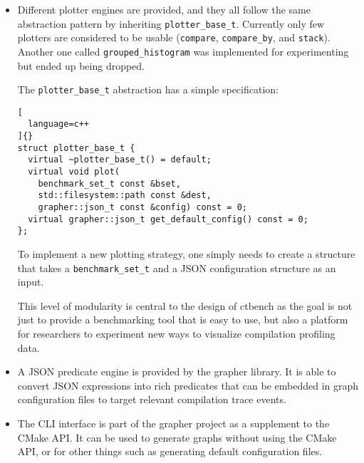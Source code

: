 \documentclass[../main]{subfiles}
\begin{document}
\begin{itemize}
\item

  Different plotter engines are provided, and they all follow the same
  abstraction pattern by inheriting \lstinline{plotter_base_t}.
  Currently only few plotters are considered to be usable
  (\lstinline{compare}, \lstinline{compare_by}, and \lstinline{stack}).
  Another one called \lstinline{grouped_histogram} was implemented
  for experimenting but ended up being dropped.

  The \lstinline{plotter_base_t} abstraction has a simple specification:
\begin{lstlisting}[
  language=c++
]{}
struct plotter_base_t {
  virtual ~plotter_base_t() = default;
  virtual void plot(
    benchmark_set_t const &bset,
    std::filesystem::path const &dest,
    grapher::json_t const &config) const = 0;
  virtual grapher::json_t get_default_config() const = 0;
};
\end{lstlisting}

  To implement a new plotting strategy, one simply needs to create a structure
  that takes a \lstinline{benchmark_set_t} and a
  JSON configuration structure as an input.

  This level of modularity is central to the design of ctbench
  as the goal is not just to provide a benchmarking tool that is easy to use,
  but also a platform for researchers to experiment new ways to visualize
  compilation profiling data.

\item

  A JSON predicate engine is provided by the grapher library.
  It is able to convert JSON expressions into rich predicates
  that can be embedded in graph configuration files to target
  relevant compilation trace events.

\item

  The CLI interface is part of the grapher project as a supplement
  to the CMake API. It can be used to generate graphs without using
  the CMake API, or for other things such as generating default
  configuration files.

\end{itemize}
\end{document}
